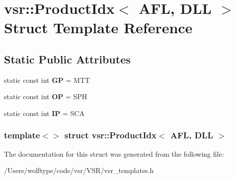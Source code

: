 \hypertarget{structvsr_1_1_product_idx_3_01_a_f_l_00_01_d_l_l_01_4}{\section{vsr\-:\-:Product\-Idx$<$ A\-F\-L, D\-L\-L $>$ Struct Template Reference}
\label{structvsr_1_1_product_idx_3_01_a_f_l_00_01_d_l_l_01_4}
}
\subsection*{Static Public Attributes}
\begin{DoxyCompactItemize}
\item 
\hypertarget{structvsr_1_1_product_idx_3_01_a_f_l_00_01_d_l_l_01_4_aa1ca6a82145663f2e0fcb170cc248d92}{static const int {\bfseries G\-P} = M\-T\-T}\label{structvsr_1_1_product_idx_3_01_a_f_l_00_01_d_l_l_01_4_aa1ca6a82145663f2e0fcb170cc248d92}

\item 
\hypertarget{structvsr_1_1_product_idx_3_01_a_f_l_00_01_d_l_l_01_4_ac7b8388086824e4038a17c358ed37bcd}{static const int {\bfseries O\-P} = S\-P\-H}\label{structvsr_1_1_product_idx_3_01_a_f_l_00_01_d_l_l_01_4_ac7b8388086824e4038a17c358ed37bcd}

\item 
\hypertarget{structvsr_1_1_product_idx_3_01_a_f_l_00_01_d_l_l_01_4_a63f4da504fe65042886cc68a45975e5e}{static const int {\bfseries I\-P} = S\-C\-A}\label{structvsr_1_1_product_idx_3_01_a_f_l_00_01_d_l_l_01_4_a63f4da504fe65042886cc68a45975e5e}

\end{DoxyCompactItemize}
\subsubsection*{template$<$$>$ struct vsr\-::\-Product\-Idx$<$ A\-F\-L, D\-L\-L $>$}



The documentation for this struct was generated from the following file\-:\begin{DoxyCompactItemize}
\item 
/\-Users/wolftype/code/vsr/\-V\-S\-R/vsr\-\_\-templates.\-h\end{DoxyCompactItemize}
